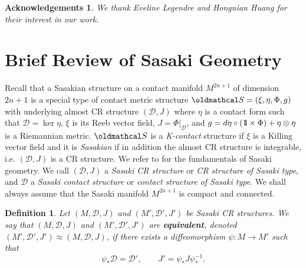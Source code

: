 \documentclass[12pt]{amsart}
\newtheorem{definition}[theorem]{Definition}
\newtheorem*{ack}{Acknowledgements}
\def\BOne{{\mathchoice {\rm 1\mskip-4mu l} {\rm 1\mskip-4mu l}
                          {\rm 1\mskip-4.5mu l} {\rm 1\mskip-5mu l}}}
\def\cald{{\mathcal D}}
\def\cals{{\oldmathcal S}}
\begin{document}
\begin{ack}
We thank Eveline Legendre and Hongnian Huang for their interest in our work.
\end{ack}


\section{Brief Review of Sasaki Geometry}
Recall that a Sasakian structure on a contact manifold $M^{2n+1}$ of dimension $2n+1$ is a special type of contact metric structure $\cals=(\xi,\eta,\Phi,g)$ with underlying almost CR structure $(\cald,J)$ where $\eta$ is a contact form such that $\cald=\ker\eta$, $\xi$ is its Reeb vector field, $J=\Phi |_\cald$, and $g=d\eta\circ (\BOne \times\Phi) +\eta\otimes\eta$ is a Riemannian metric. $\cals$ is a {\it K-contact} structure if $\xi$ is a Killing vector field and it is {\it Sasakian} if in addition the almost CR structure is integrable, i.e. $(\cald,J)$ is a CR structure. We refer to \cite{BG05} for the fundamentals of Sasaki geometry. We call $(\cald,J)$ a  {\it Sasaki CR structure} or {\it CR structure of Sasaki type}, and $\cald$ a {\it Sasaki contact structure} or {\it contact structure of Sasaki type}. We shall always assume that the Sasaki manifold $M^{2n+1}$ is compact and connected.

\begin{definition}\label{SasCRequiv}
Let $(M,\cald,J)$ and $(M',\cald',J')$ be Sasaki CR structures. We say that $(M,\cald,J)$ and $(M',\cald',J')$ are {\bf equivalent}, denoted $(M',\cald',J')\approx(M,\cald,J)$, if there exists a diffeomorphism $\psi:M\longrightarrow M'$ such that 
$$\psi_*\cald=\cald', \qquad J'=\psi_* J \psi_*^{-1}.$$
\end{definition}
\end{document}
